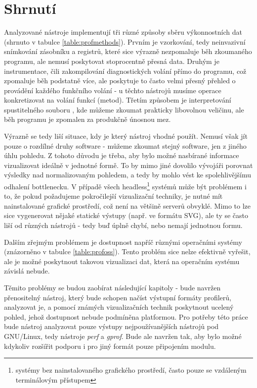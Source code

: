 \documentclass[czech,BP]{thesiskiv}
\begin{document}
\section{Shrnutí}

Analyzované nástroje implementují tři různé způsoby sběru výkonnostních dat (shrnuto v tabulce \ref{table:profmethods}). Prvním je vzorkování, tedy neinvazivní snímkování zásobníku a registrů, které sice výrazně nezpomaluje běh zkoumaného programu, ale nemusí poskytovat stoprocentně přesná data. Druhým je instrumentace, čili zakompilování diagnostických volání přímo do programu, což zpomaluje běh podstatně více, ale poskytuje to často velmi přesný přehled o provádění každého funkčního volání - u těchto nástrojů musíme operace konkretizovat na volání funkcí (metod). Třetím způsobem je interpretování spustitelného souboru , kde můžeme zkoumat prakticky libovolnou veličinu, ale běh programu je zpomalen za produkčně únosnou mez.

Výrazně se tedy liší situace, kdy je který nástroj vhodné použít. Nemusí však jít pouze o rozdílné druhy software - můžeme zkoumat stejný software, jen z jiného úhlu pohledu. Z tohoto důvodu je třeba, aby bylo možné nasbírané informace vizualizovat ideálně v jednotné formě. To by mimo jiné dovolilo vývojáři porovnat výsledky nad normalizovaným pohledem, a tedy by mohlo vést ke spolehlivějšímu odhalení bottlenecku. V případě všech headless\footnote{systémy bez nainstalovaného grafického prostředí, často pouze se vzdáleným terminálovým přístupem} systémů může být problémem i to, že pokud požadujeme pokročilejší vizualizační techniky, je nutné mít nainstalované grafické prostředí, což není na většině serverů obvyklé. Mimo to lze sice vygenerovat nějaké statické výstupy (např. ve formátu SVG), ale ty se často liší od různých nástrojů - tedy buď úplně chybí, nebo nemají jednotnou formu.

Dalším zřejmým problémem je dostupnost napříč různými operačními systémy (znázorněno v tabulce \ref{table:profoss}). Tento problém sice nelze efektivně vyřešit, ale je možné poskytnout takovou vizualizaci dat, která na operačním systému závislá nebude.

Těmito problémy se budou zaobírat následující kapitoly - bude navržen přenositelný nástroj, který bude schopen načíst výstupní formáty profilerů, analyzovat je, a pomocí známých vizualizačních technik poskytnout ucelený pohled, jehož dostupnost nebude podmíněna platformou. Pro potřeby této práce bude nástroj analyzovat pouze výstupy nejpoužívanějších nástrojů pod GNU/Linux, tedy nástroje \emph{perf} a \emph{gprof}. Bude ale navržen tak, aby bylo možné kdykoliv rozšířit podporu i pro jiný formát pouze připojením modulu.
\end{document}
